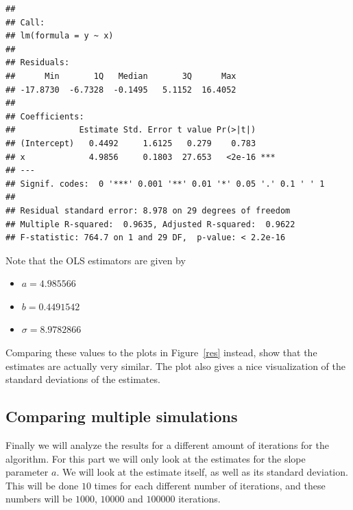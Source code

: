 \documentclass[a4paper,10pt]{article}\usepackage[]{graphicx}\usepackage[]{color}
\makeatletter
\newenvironment{kframe}{%
 \def\at@end@of@kframe{}%
 \ifinner\ifhmode%
  \def\at@end@of@kframe{\end{minipage}}%
  \begin{minipage}{\columnwidth}%
 \fi\fi%
 \def\FrameCommand##1{\hskip\@totalleftmargin \hskip-\fboxsep
 \colorbox{shadecolor}{##1}\hskip-\fboxsep
     \hskip-\linewidth \hskip-\@totalleftmargin \hskip\columnwidth}%
 \MakeFramed {\advance\hsize-\width
   \@totalleftmargin\z@ \linewidth\hsize
   \@setminipage}}%
 {\par\unskip\endMakeFramed%
 \at@end@of@kframe}
\newenvironment{knitrout}{}{} %
\makeatother
\begin{document}
\newpage
\begin{knitrout}
\color{fgcolor}\begin{kframe}
\begin{verbatim}
## 
## Call:
## lm(formula = y ~ x)
## 
## Residuals:
##      Min       1Q   Median       3Q      Max 
## -17.8730  -6.7328  -0.1495   5.1152  16.4052 
## 
## Coefficients:
##             Estimate Std. Error t value Pr(>|t|)    
## (Intercept)   0.4492     1.6125   0.279    0.783    
## x             4.9856     0.1803  27.653   <2e-16 ***
## ---
## Signif. codes:  0 '***' 0.001 '**' 0.01 '*' 0.05 '.' 0.1 ' ' 1
## 
## Residual standard error: 8.978 on 29 degrees of freedom
## Multiple R-squared:  0.9635,	Adjusted R-squared:  0.9622 
## F-statistic: 764.7 on 1 and 29 DF,  p-value: < 2.2e-16
\end{verbatim}
\end{kframe}
\end{knitrout}

\noindent Note that the OLS estimators are given by

\begin{itemize}
  \item $a = 4.985566$
  \item $b = 0.4491542$
  \item $\sigma = 8.9782866$
\end{itemize}

\noindent Comparing these values to the plots in Figure~\ref{res} instead, show that the estimates are actually very similar. The plot also gives a nice visualization of the standard deviations of the estimates.

\subsection{Comparing multiple simulations}

Finally we will analyze the results for a different amount of iterations for the algorithm. For this part we will only look at the estimates for the slope parameter $a$. We will look at the estimate itself, as well as its standard deviation. This will be done $10$ times for each different number of iterations, and these numbers will be $1000$, $10000$ and $100000$ iterations. 
\end{document}

